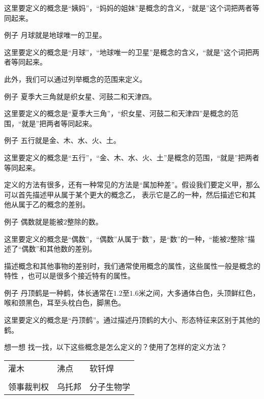 \documentclass[12pt,UTF8,a4paper]{article}
\begin{document}
这里要定义的概念是“姨妈”，“妈妈的姐妹”是概念的含义，“就是”这个词把两者等同起来。

\begin{blockin}{例子}
    月球就是地球唯一的卫星。 
\end{blockin}
    
这里要定义的概念是“月球”，“地球唯一的卫星”是概念的含义，“就是”这个词把两者等同起来。

此外，我们可以通过列举概念的范围来定义。

\begin{blockin}{例子}
    夏季大三角就是织女星、河鼓二和天津四。
\end{blockin}

这里要定义的概念是“夏季大三角”，“织女星、河鼓二和天津四”是概念的范围，“就是”把两者等同起来。

\begin{blockin}{例子}
    五行就是金、木、水、火、土。
\end{blockin}

这里要定义的概念是“五行”，“金、木、水、火、土”是概念的范围，“就是”把两者等同起来。

定义的方法有很多，还有一种常见的方法是“属加种差”。假设我们要定义甲，那么可以首先描述甲从属于某个更大的概念乙，
表示它是乙的一种，然后描述它和其他从属于乙的概念的差别。

\begin{blockin}{例子}
    偶数就是能被$2$整除的数。
\end{blockin}

这里要定义的概念是“偶数”，“偶数”从属于“数”，是“数”的一种，“能被$2$整除”描述了“偶数”和其他数的差别。

描述概念和其他事物的差别时，我们通常使用概念的属性，这些属性一般是概念的特性
，也可以是很多个接近特有的属性。

\begin{blockin}{例子}
    丹顶鹤是一种鹤，体长通常在$1.2$至$1.6$米之间，大多通体白色，头顶鲜红色，喉和颈黑色，耳至头枕白色，脚黑色。
\end{blockin}

这里要定义的概念是“丹顶鹤”。通过描述丹顶鹤的大小、形态特征来区别于其他的鹤。

\begin{blockaft}{想一想}
    找一找，以下这些概念是怎么定义的？使用了怎样的定义方法？\\
    \begin{center}
        \begin{tabular}{p{8em}<{\centering} p{8em}<{\centering} p{8em}<{\centering} }
            灌木 & 沸点 & 软钎焊 \\
            & & \\
            领事裁判权 & 乌托邦 & 分子生物学 \\
        \end{tabular}
    \end{center}
\end{blockaft}
\end{document}
